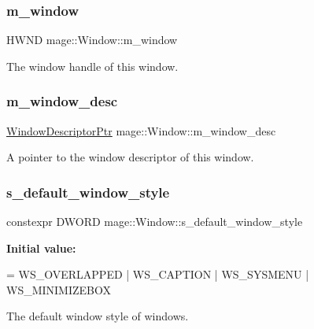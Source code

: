 \subsubsection{\texorpdfstring{m\+\_\+window}{m\_window}}
{\footnotesize\ttfamily H\+W\+ND mage\+::\+Window\+::m\+\_\+window\hspace{0.3cm}{\ttfamily [private]}}

The window handle of this window. \hypertarget{classmage_1_1_window_a51bbea46f4590a68d384d0b8d14e0cd8}{}\label{classmage_1_1_window_a51bbea46f4590a68d384d0b8d14e0cd8} 
\subsubsection{\texorpdfstring{m\+\_\+window\+\_\+desc}{m\_window\_desc}}
{\footnotesize\ttfamily \hyperlink{classmage_1_1_window_ac41b052d8e8dd0571b3ec862e8f6da05}{Window\+Descriptor\+Ptr} mage\+::\+Window\+::m\+\_\+window\+\_\+desc\hspace{0.3cm}{\ttfamily [private]}}

A pointer to the window descriptor of this window. \hypertarget{classmage_1_1_window_ac680bdd3d5359f66b2dea082ef45e0da}{}\label{classmage_1_1_window_ac680bdd3d5359f66b2dea082ef45e0da} 
\subsubsection{\texorpdfstring{s\+\_\+default\+\_\+window\+\_\+style}{s\_default\_window\_style}}
{\footnotesize\ttfamily constexpr D\+W\+O\+RD mage\+::\+Window\+::s\+\_\+default\+\_\+window\+\_\+style\hspace{0.3cm}{\ttfamily [static]}}

{\bfseries Initial value\+:}
\begin{DoxyCode}
= WS\_OVERLAPPED 
                                                      | WS\_CAPTION 
                                                      | WS\_SYSMENU 
                                                      | WS\_MINIMIZEBOX
\end{DoxyCode}
The default window style of windows. 